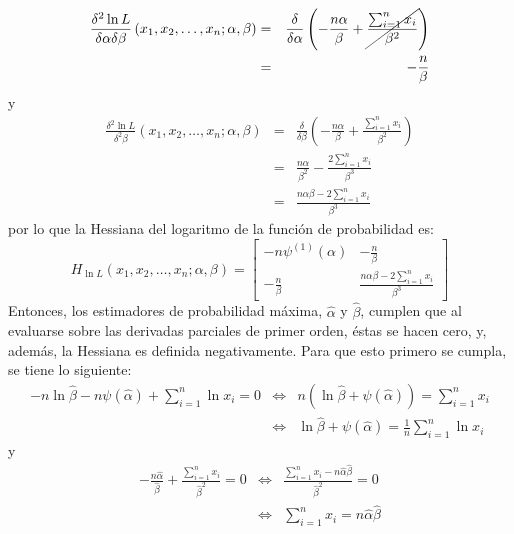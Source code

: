 \begin{solucion}
\begin{enumerate}
\begin{eqnarray*}
   \frac{\delta^2 \ln L}{\delta \alpha \delta\beta} \left( x_1, x_2, \ldots, x_n; \alpha, \beta \right) & = & \frac{\delta}{\delta \alpha} \left( - \frac{n\alpha}{\beta} + \cancel{ \frac{\sum_{i=1}^n x_i}{\beta^2} } \right) \\
   & = & -\frac{n}{\beta}
  \end{eqnarray*}
  y
  \begin{eqnarray*}
   \frac{\delta^2 \ln L}{\delta^2 \beta} \left( x_1, x_2, \ldots, x_n; \alpha, \beta \right) & = & \frac{\delta}{\delta \beta} \left( - \frac{n\alpha}{\beta} + \frac{\sum_{i=1}^n x_i}{\beta^2} \right) \\
   & = & \frac{n\alpha}{\beta^2} - \frac{2\sum_{i=1}^{n} x_i }{\beta^3} \\
   & = & \frac{n\alpha\beta - 2\sum_{i=1}^n x_i}{\beta^3}
  \end{eqnarray*}
  por lo que la Hessiana del logaritmo de la funci\'on de probabilidad es:
  \begin{equation*}
   H_{\ln L} \left( x_1, x_2, \ldots, x_n; \alpha, \beta \right) =
   \begin{bmatrix}
    -n\psi^{(1)}(\alpha) & \displaystyle{ -\frac{n}{\beta} } \\
    \displaystyle{ -\frac{n}{\beta} } & \displaystyle{ \frac{n\alpha\beta - 2\sum_{i=1}^n x_i}{\beta^3} }
   \end{bmatrix}
  \end{equation*}
  Entonces, los estimadores de probabilidad m\'axima, $\widehat{\alpha}$ y $\widehat{\beta}$, cumplen que al evaluarse sobre las derivadas parciales de primer orden, \'estas se hacen cero, y, adem\'as, la Hessiana es definida negativamente. Para que esto primero se cumpla, se tiene lo siguiente:
  \begin{eqnarray*}
   -n\ln \widehat{\beta} - n\psi\left(\widehat{\alpha}\right) + \sum_{i=1}^{n} \ln x_i = 0 & \Leftrightarrow & n\left( \ln \widehat{\beta} + \psi\left(\widehat{\alpha}\right) \right) = \sum_{i=1}^n x_i \\
   & \Leftrightarrow & \ln \widehat{\beta} + \psi\left(\widehat{\alpha}\right) = \frac{1}{n} \sum_{i=1}^{n} \ln x_i
  \end{eqnarray*}
  y
  \begin{eqnarray*}
   - \frac{n\widehat{\alpha}}{\widehat{\beta}} + \frac{\sum_{i=1}^n x_i}{\widehat{\beta}^2} = 0 & \Leftrightarrow & \frac{ \sum_{i=1}^n x_i - n\widehat{\alpha}\widehat{\beta}}{\widehat{\beta}^2} = 0 \\
   & \Leftrightarrow & \sum_{i=1}^n x_i = n\widehat{\alpha}\widehat{\beta} \\

\end{eqnarray*}
\end{enumerate}
\end{solucion}
